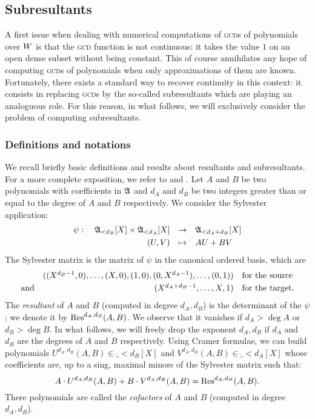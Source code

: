\documentclass{article}
\begin{document}
\subsection{Subresultants}
\label{subsec:subres}

A first issue when dealing with numerical computations of \textsc{gcd}s 
of polynomials over $W$ is that the \textsc{gcd} function is not 
continuous: it takes the value $1$ on an open dense subset without being 
constant. This of course annihilates any hope of computing \textsc{gcd}s 
of polynomials when only approximations of them are known. Fortunately, 
there exists a standard way to recover continuity in this context: it 
consists in replacing \textsc{gcd}s by the so-called subresultants which 
are playing an analoguous role. For this reason, in what follows, we will 
exclusively consider the problem of computing subresultants.

\subsubsection*{Definitions and notations}

We recall briefly basic definitions and results about resultants and 
subresultants. For a more complete exposition, we refer to \cite[\S 
3.3]{cohen} and \cite[\S 4.1]{winkler}.
Let $A$ and $B$ be two polynomials with coefficients in $\mathfrak A$ and 
$d_A$ and $d_B$ be two integers greater than or equal to the degree of 
$A$ and $B$ respectively. We consider the Sylvester application:
$$\begin{array}{rcl}
\psi : \quad
\ring_{< d_B}[X] \times \ring_{< d_A}[X] & \to &
\ring_{< d_A+d_B}[X] \smallskip \\
(U,V) & \mapsto & AU + BV
\end{array}$$
The Sylvester matrix is the matrix of $\psi$ in the canonical ordered
basis, which are
$$\begin{array}{rrl}
& ((X^{d_B-1},0), \ldots, (X,0), (1,0), (0,X^{d_A-1}), \ldots, (0,1))
& \text{for the source} \smallskip \\
\text{and} & (X^{d_A+d_B-1}, \ldots, X, 1) &
\text{for the target.}
\end{array}$$
The \emph{resultant} of $A$ and $B$ (computed in degree $d_A, d_B$) is the 
determinant of the $\psi$; we denote it by $\text{\rm Res}^{d_A,d_B}(A,B)$. We 
observe that it vanishes if $d_A > \deg A$ or $d_B > \deg B$. In what 
follows, we will freely drop the exponent $d_A, d_B$ if $d_A$ and $d_B$ 
are the degrees of $A$ and $B$ respectively.
Using Cramer formulae, we can build polynomials $U^{d_A, d_B}(A,B) \in
\ring_{< d_B}[X]$ and $V^{d_A, d_B}(A,B) \in \ring_{< d_A}[X]$ whose 
coefficients are, up to a sing, maximal minors of the Sylvester matrix 
such that:
$$A \cdot U^{d_A, d_B}(A,B) + B \cdot V^{d_A, d_B}(A,B) = 
\text{\rm Res}^{d_A, d_B}(A,B).$$
There polynomials are called the \emph{cofactors} of $A$ and $B$
(computed in degree $d_A, d_B$).
\end{document}
